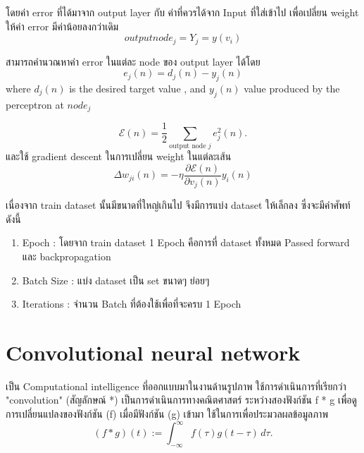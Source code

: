 โดยค่า error ที่ได้มาจาก output layer กับ ค่าที่ควรได้จาก Input ที่ใส่เข้าไป เพื่อเปลี่ยน weight ให้ค่า error มีค่าน้อยลงกว่าเดิม
\begin{equation} output node_j =  Y_j =  y(v_i)  \end{equation}

 สามารถคำนวณหาค่า error ในแต่ละ node ของ output layer ได้โดย
 \begin{equation}  e_j(n)=d_j(n)-y_j(n) 
 \end{equation}
 where $d_{j}(n)$  is the desired target value , and $y_{j}(n)$   value produced by the perceptron at $node_j$


 
\begin{equation} 
{\displaystyle {\mathcal {E}}(n)={\frac {1}{2}}\sum _{{\text{output node }}j}e_{j}^{2}(n)}.
\end{equation} 
และใช้  gradient descent ในการเปลี่ยน weight ในแต่ละเส้น
\begin{equation} 
\Delta w_{ji} (n) = -\eta\frac{\partial\mathcal{E}(n)}{\partial v_j(n)} y_i(n)
\end{equation} 


\newpage


เนื่องจาก train dataset นั้นมีขนาดที่ใหญ่เกินไป จึงมีการแบ่ง dataset ให้เล็กลง ซึ่งจะมีคำศัพท์ ดังนี้

\begin{enumerate}
  \item Epoch :  โดยจาก train dataset  1 Epoch คือการที่ dataset ทั้งหมด Passed forward และ backpropagation
  \item Batch Size : แบ่ง dataset เป็น set ขนาดๆ ย่อยๆ 
  \item Iterations : จำนวน Batch ที่ต้องใช้เพื่อที่จะครบ 1 Epoch
\end{enumerate} 
 
 
\section{Convolutional neural network}
เป็น Computational intelligence ที่ออกแบบมาในงานด้านรูปภาพ 
ใช้การดำเนินการที่เรียกว่า "convolution"  (สัญลักษณ์ *) เป็นการดำเนินการทางคณิตศาสตร์ ระหว่างสองฟังก์ชัน f * g เพื่อดูการเปลี่ยนแปลงของฟังก์ชัน (f) เมื่อมีฟังก์ชัน (g) เข้ามา 
ใช้ในการเพื่อประมวลผลข้อมูลภาพ  
\begin{equation}
   {\displaystyle (f*g)(t):=\int _{-\infty }^{\infty }f(\tau )g(t-\tau )\,d\tau .}
\end{equation} 
 
